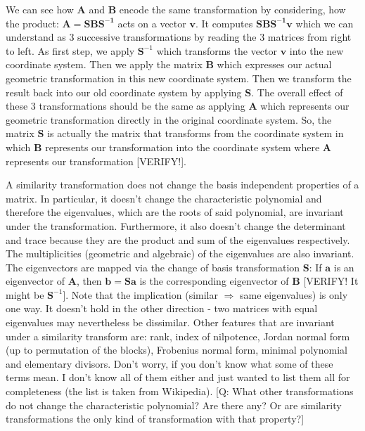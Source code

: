 \medskip
We can see how $\mathbf{A}$ and $\mathbf{B}$ encode the same transformation by considering, how the product: $\mathbf{A} = \mathbf{S B S^{-1}}$ acts on a vector $\mathbf{v}$. It computes $\mathbf{S B S^{-1} v}$ which we can understand as 3 successive transformations by reading the 3 matrices from right to left. As first step, we apply $\mathbf{S}^{-1}$ which transforms the vector $\mathbf{v}$ into the new coordinate system. Then we apply the matrix $\mathbf{B}$ which expresses our actual geometric transformation in this new coordinate system. Then we transform the result back into our old coordinate system by applying $\mathbf{S}$. The overall effect of these 3 transformations should be the same as applying $\mathbf{A}$ which represents our geometric transformation directly in the original coordinate system. So, the matrix $\mathbf{S}$ is actually the matrix that transforms from the coordinate system in which $\mathbf{B}$ represents our transformation into the coordinate system where $\mathbf{A}$ represents our transformation [VERIFY!].




\medskip
A similarity transformation does not change the basis independent properties of a matrix. In particular, it doesn't change the characteristic polynomial and therefore the eigenvalues, which are the  roots of said polynomial, are invariant under the transformation. Furthermore, it also doesn't change the determinant and trace because they are the product and sum of the eigenvalues respectively. The multiplicities (geometric and algebraic) of the eigenvalues are also invariant. The eigenvectors are mapped via the change of basis transformation $\mathbf{S}$: If $\mathbf{a}$ is an eigenvector of  $\mathbf{A}$, then $\mathbf{b} = \mathbf{S a}$ is the corresponding eigenvector of $\mathbf{B}$ [VERIFY! It might be $\mathbf{S}^{-1}$]. Note that the implication (similar $\Rightarrow$ same eigenvalues) is only one way. It doesn't hold in the other direction - two matrices with equal eigenvalues may nevertheless be dissimilar. Other features that are invariant under a similarity transform are: rank, index of nilpotence, Jordan normal form (up to permutation of the blocks), Frobenius normal form, minimal polynomial and elementary divisors. Don't worry, if you don't know what some of these terms mean. I don't know all of them either and just wanted to list them all for completeness (the list is taken from Wikipedia). [Q: What other transformations do not change the characteristic polynomial? Are there any? Or are similarity transformations the only kind of transformation with that property?]

